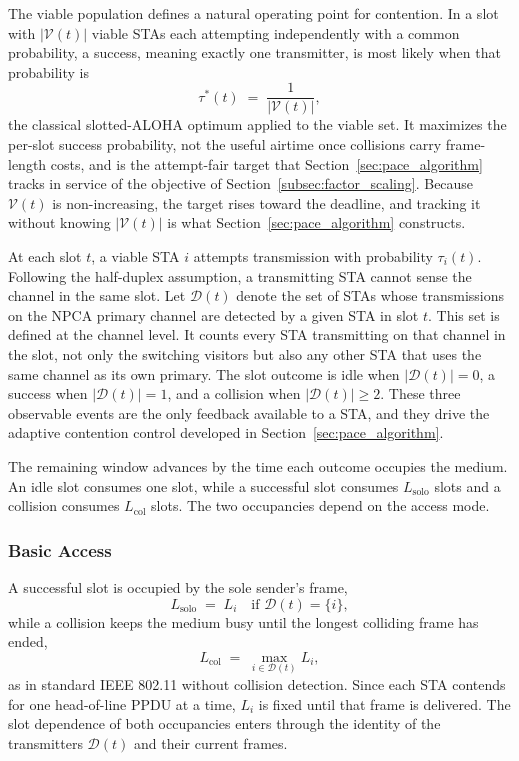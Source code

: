 \documentclass[journal,10pt]{IEEEtran}
\begin{document}
The viable population defines a natural operating point for contention. In a slot with $|\mathcal{V}(t)|$ viable STAs each attempting independently with a common probability, a success, meaning exactly one transmitter, is most likely when that probability is
\begin{equation}
    \tau^*(t) \;=\; \frac{1}{|\mathcal{V}(t)|},
    \label{eq:tau_opt}
\end{equation}
the classical slotted-ALOHA optimum applied to the viable set. It maximizes the per-slot success probability, not the useful airtime once collisions carry frame-length costs, and is the attempt-fair target that Section~\ref{sec:pace_algorithm} tracks in service of the objective of Section~\ref{subsec:factor_scaling}. Because $\mathcal{V}(t)$ is non-increasing, the target rises toward the deadline, and tracking it without knowing $|\mathcal{V}(t)|$ is what Section~\ref{sec:pace_algorithm} constructs.

At each slot $t$, a viable STA $i$ attempts transmission with probability $\tau_i(t)$. Following the half-duplex assumption, a transmitting STA cannot sense the channel in the same slot. Let $\mathcal{D}(t)$ denote the set of STAs whose transmissions on the NPCA primary channel are detected by a given STA in slot $t$. This set is defined at the channel level. It counts every STA transmitting on that channel in the slot, not only the switching visitors but also any other STA that uses the same channel as its own primary. The slot outcome is idle when $|\mathcal{D}(t)|=0$, a success when $|\mathcal{D}(t)|=1$, and a collision when $|\mathcal{D}(t)|\ge 2$. These three observable events are the only feedback available to a STA, and they drive the adaptive contention control developed in Section~\ref{sec:pace_algorithm}.

The remaining window advances by the time each outcome occupies the medium. An idle slot consumes one slot, while a successful slot consumes $L_\mathrm{solo}$ slots and a collision consumes $L_\mathrm{col}$ slots. The two occupancies depend on the access mode.

\subsubsection{Basic Access}
A successful slot is occupied by the sole sender's frame,
\begin{equation}
    L_\mathrm{solo} \;=\; L_i \quad \text{if } \mathcal{D}(t)=\{i\},
    \label{eq:lsolo_basic}
\end{equation}
while a collision keeps the medium busy until the longest colliding frame has ended,
\begin{equation}
    L_\mathrm{col} \;=\; \max_{i\in\mathcal{D}(t)} L_i,
    \label{eq:lmax}
\end{equation}
as in standard IEEE 802.11 without collision detection. Since each STA contends for one head-of-line PPDU at a time, $L_i$ is fixed until that frame is delivered. The slot dependence of both occupancies enters through the identity of the transmitters $\mathcal{D}(t)$ and their current frames.
\end{document}
